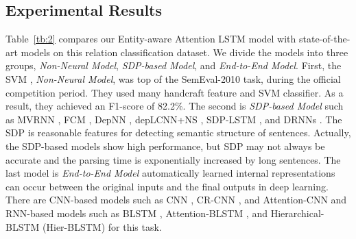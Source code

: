 \documentclass[twoside,leqno,twocolumn]{article}
\begin{document}
\subsection{Experimental Results}
Table~\ref{tb:2} compares our Entity-aware Attention LSTM model with state-of-the-art models on this relation classification dataset. 
We divide the models into three groups, \textit{Non-Neural Model}, \textit{SDP-based Model}, and \textit{End-to-End Model}.
First, the SVM \cite{rink2010utd}, \textit{Non-Neural Model}, was top of the SemEval-2010 task, during the official competition period. 
They used many handcraft feature and SVM classifier. 
As a result, they achieved an F1-score of 82.2\%.
The second is \textit{SDP-based Model} such as MVRNN \cite{socher2012semantic}, FCM \cite{yu2014factor}, DepNN \cite{liu2015dependency}, depLCNN+NS \cite{xu2015semantic}, SDP-LSTM \cite{xu2015classifying}, and DRNNs \cite{xu2016improved}.
The SDP is reasonable features for detecting semantic structure of sentences.
Actually, the SDP-based models show high performance, but SDP may not always be accurate and the parsing time is exponentially increased by long sentences.
The last model is \textit{End-to-End Model} automatically learned internal representations can occur between the original inputs and the final outputs in deep learning.
There are CNN-based models such as CNN \cite{zeng2014relation, nguyen2015relation}, CR-CNN \cite{dos2015classifying}, and Attention-CNN \cite{huang2016attention} and RNN-based models such as BLSTM \cite{zhang2015bidirectional}, Attention-BLSTM \cite{zhou2016attention}, and Hierarchical-BLSTM (Hier-BLSTM) \cite{yang2016hierarchical} for this task.
\end{document}
